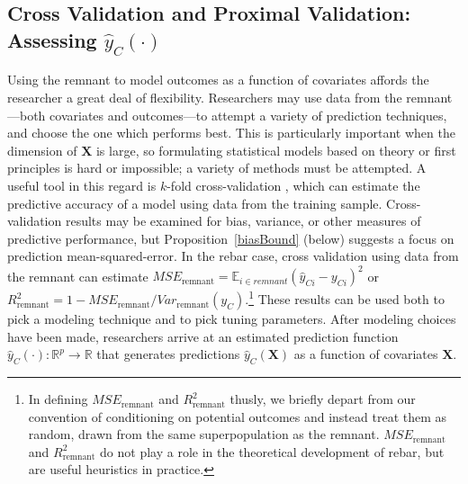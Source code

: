 \documentclass[12pt]{article}\usepackage[]{graphicx}\usepackage[]{color}
\newcommand{\yhat}{\hat{y}_C}
\newcommand{\EE}{\mathbb{E}}
\newcommand{\algorithm}{\hat{y}_C(\cdot)}
\newcommand{\covMat}{\bm{X}}
\newcommand{\covVec}{x}
\begin{document}





\subsection{Cross Validation and Proximal Validation: Assessing  $\algorithm$}\label{sec:remnant}

Using the remnant to model outcomes as a function of covariates affords the researcher a great deal of flexibility.
Researchers may use data from the remnant---both covariates and
outcomes---to attempt a variety of prediction techniques, and choose
the one which performs best.
This is particularly important when the dimension of $\covMat$ is large, so formulating statistical models based on theory or first principles is hard or impossible; a variety of methods must be attempted.
A useful tool in this regard is $k$-fold cross-validation
\citep{crossvalidation}, which can estimate the predictive accuracy of
a model using data from the training sample.
Cross-validation results may be examined for bias, variance, or other
measures of predictive performance, but Proposition~\ref{biasBound}
(below) suggests a
focus on prediction mean-squared-error.
In the rebar case, cross validation using data from the remnant can estimate $MSE_{\text{remnant}}=\EE_{i\in remnant} (\hat{y}_{Ci}-y_{Ci})^2$ or $R^2_{\text{remnant}}=1-MSE_{\text{remnant}}/Var_{\text{remnant}}(y_C)$.\footnote{In defining $MSE_{\text{remnant}}$ and $R^2_{\text{remnant}}$ thusly, we briefly depart from our convention of conditioning on potential outcomes and instead treat them as random, drawn from the same superpopulation as the remnant. $MSE_{\text{remnant}}$ and $R^2_{\text{remnant}}$ do not play a role in the theoretical development of rebar, but are useful heuristics in practice.}
These results can be used both to pick a modeling technique and to
pick tuning parameters.
After modeling choices have been made, researchers arrive at an
estimated prediction function $\algorithm:\mathbb{R}^p\rightarrow
\mathbb{R}$ that generates predictions $\hat{y}_C(\covMat)$ as a function of
covariates $\covMat$.
\end{document}
